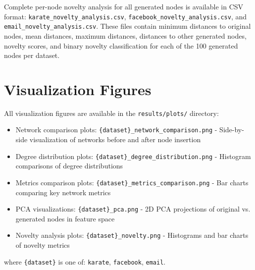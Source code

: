 \documentclass[12pt]{article}
\begin{document}
Complete per-node novelty analysis for all generated nodes is available in CSV format: \texttt{karate\_novelty\_analysis.csv}, \texttt{facebook\_novelty\_analysis.csv}, and \texttt{email\_novelty\_analysis.csv}. These files contain minimum distances to original nodes, mean distances, maximum distances, distances to other generated nodes, novelty scores, and binary novelty classification for each of the 100 generated nodes per dataset.

\section{Visualization Figures}

All visualization figures are available in the \texttt{results/plots/} directory:

\begin{itemize}
    \item Network comparison plots: \texttt{\{dataset\}\_network\_comparison.png} - Side-by-side visualization of networks before and after node insertion
    \item Degree distribution plots: \texttt{\{dataset\}\_degree\_distribution.png} - Histogram comparisons of degree distributions
    \item Metrics comparison plots: \texttt{\{dataset\}\_metrics\_comparison.png} - Bar charts comparing key network metrics
    \item PCA visualizations: \texttt{\{dataset\}\_pca.png} - 2D PCA projections of original vs. generated nodes in feature space
    \item Novelty analysis plots: \texttt{\{dataset\}\_novelty.png} - Histograms and bar charts of novelty metrics
\end{itemize}

where \texttt{\{dataset\}} is one of: \texttt{karate}, \texttt{facebook}, \texttt{email}.
\end{document}

